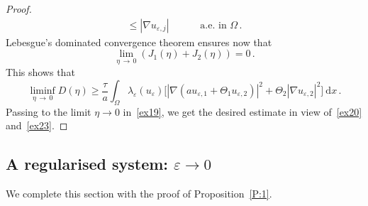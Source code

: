 \documentclass[10pt]{amsart}
\theoremstyle{definition}\newtheorem{defi}[theo]{Definition}\newtheorem{rema}[theo]{Remark}\newtheorem{exam}[theo]{Example}\newtheorem{exem}[theo]{Example}\newtheorem{nota}[theo]{Notation}
\newcommand{\rmd}{\mathrm{d}}
\begin{document}
\begin{proof}
\begin{align*}
\leq |\nabla u_{\varepsilon,j}|\qquad &\text{ a.e. in $\Omega$}\,.
\end{align*}
Lebesgue's dominated convergence theorem ensures now that
\begin{equation*}
\lim_{\eta\,\to\,0} \left(J_1(\eta) + J_2(\eta) \right) = 0\,.
\end{equation*}
This shows that
\begin{equation}
\liminf_{\eta\,\to\,0} D(\eta) \ge \frac{\tau}{a} \int_\Omega\lambda_\varepsilon(u_{\varepsilon}) \big[\left|\nabla \left(a u_{\varepsilon,1}+\Theta_1 u_{\varepsilon,2}\right)\right|^2 + \Theta_2\left|\nabla u_{\varepsilon,2}\right|^2 \big]\ \rmd x\,. \label{ex23}
\end{equation}
Passing to the limit $\eta\to 0$ in~\eqref{ex19}, we get the desired estimate in view of~\eqref{ex20} and~\eqref{ex23}.
\end{proof}



\subsection{A regularised system: \texorpdfstring{$\varepsilon\to 0$}{varepsilon to 0}}\label{sec2.4}



We complete this section with the proof of Proposition~\ref{P:1}.
\end{document}
